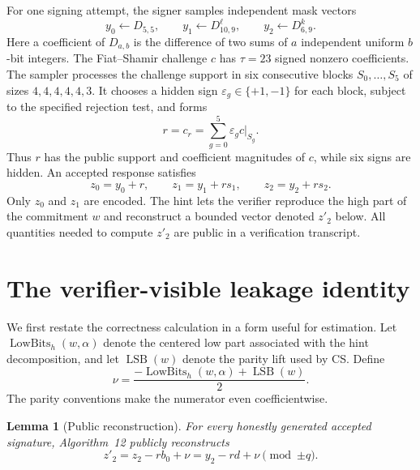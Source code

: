 \documentclass[11pt]{article}
\newtheorem{lemma}{Lemma}
\begin{document}
For one signing attempt, the signer samples independent mask vectors
\[
 y_0\leftarrow D_{5,5},\qquad
 y_1\leftarrow D_{10,9}^{\ell},\qquad
 y_2\leftarrow D_{6,9}^{k}.
\]
Here a coefficient of $D_{a,b}$ is the difference of two sums of $a$ independent uniform
$b$-bit integers.  The Fiat--Shamir challenge $c$ has $\tau=23$ signed nonzero
coefficients.  The sampler processes the challenge support in six consecutive blocks
$S_0,\ldots,S_5$ of sizes $4,4,4,4,4,3$.  It chooses a hidden sign
$\varepsilon_g\in\{+1,-1\}$ for each block, subject to the specified rejection test, and
forms
\begin{equation}
  r=c_r=\sum_{g=0}^{5}\varepsilon_g c\vert_{S_g}.       \label{eq:r}
\end{equation}
Thus $r$ has the public support and coefficient magnitudes of $c$, while six signs are hidden.
An accepted response satisfies
\begin{equation}
 z_0=y_0+r,\qquad z_1=y_1+rs_1,\qquad z_2=y_2+rs_2.     \label{eq:responses}
\end{equation}
Only $z_0$ and $z_1$ are encoded.  The hint lets the verifier reproduce the high part of the
commitment $w$ and reconstruct a bounded vector denoted $z'_2$ below.  All quantities needed
to compute $z'_2$ are public in a verification transcript.

\section{The verifier-visible leakage identity}
\label{sec:identity}

We first restate the correctness calculation in a form useful for estimation.  Let
$\operatorname{LowBits}_h(w,\alpha)$ denote the centered low part associated with the hint
decomposition, and let $\operatorname{LSB}(w)$ denote the parity lift used by CS.  Define
\begin{equation}
  \nu=\frac{-\operatorname{LowBits}_h(w,\alpha)+\operatorname{LSB}(w)}{2}. \label{eq:nu}
\end{equation}
The parity conventions make the numerator even coefficientwise.

\begin{lemma}[Public reconstruction]
For every honestly generated accepted signature, Algorithm~12 publicly reconstructs
\begin{equation}
 z'_2=z_2-rb_0+\nu=y_2-rd+\nu\pmod{\pm q}.             \label{eq:leak}
\end{equation}
\end{lemma}
\end{document}
